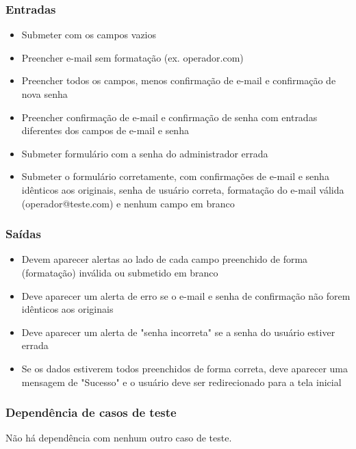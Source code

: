 \subsubsection{Entradas}

\begin{itemize}

	\item Submeter com os campos vazios 
	\item Preencher e-mail sem formatação (ex. operador.com)
	\item Preencher todos os campos, menos confirmação de e-mail e confirmação de nova senha
	\item Preencher confirmação de e-mail e confirmação de senha com entradas diferentes dos campos de e-mail e senha
	\item Submeter formulário com a senha do administrador errada
	\item Submeter o formulário corretamente, com confirmações de e-mail e senha idênticos aos originais, senha de usuário correta, formatação do e-mail válida (operador@teste.com) e nenhum campo em branco
	
\end{itemize}

\subsubsection{Saídas}

\begin{itemize}

	\item Devem aparecer alertas ao lado de cada campo preenchido de forma (formatação) inválida ou submetido em branco
	\item Deve aparecer um alerta de erro se o e-mail e senha de confirmação não forem idênticos aos originais
	\item Deve aparecer um alerta de "senha incorreta" se a senha do usuário estiver errada
	\item Se os dados estiverem todos preenchidos de forma correta, deve aparecer uma mensagem de "Sucesso" e o usuário deve ser redirecionado para a tela inicial
	
\end{itemize}

\subsubsection{Dependência de casos de teste}
Não há dependência com nenhum outro caso de teste.